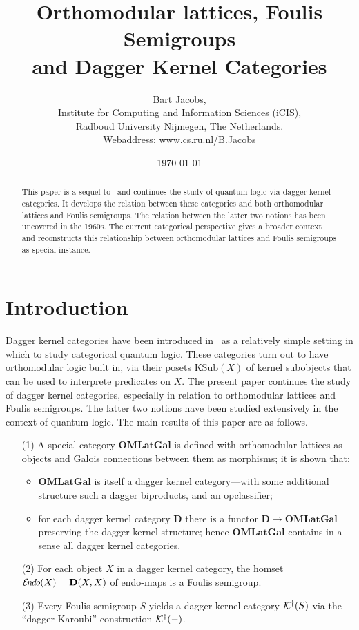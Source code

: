 \documentclass{article}
\title{Orthomodular lattices, Foulis Semigroups \\
       and Dagger Kernel Categories}
\author{Bart Jacobs, \\
{\small Institute for Computing and Information Sciences (iCIS),} \\[-.5em]
{\small Radboud University Nijmegen, The Netherlands.} \\[-.5em]
{\small Webaddress: \url{www.cs.ru.nl/B.Jacobs}}}
\date{\small \today}
\newcommand{\Cat}[1]{\ensuremath{\mathbf{#1}}}
\newcommand{\KSub}{\ensuremath{\mathrm{KSub}}}
\newcommand{\dagKaroubi}[1]{{\cal K}^{\dag}(#1)}
\newcommand{\EndoHom}[1]{{\cal E}{\kern-.5ex}\textit{n}{\kern-.2ex}\textit{d}{\kern-.2ex}\textit{o}(#1)}
\begin{document}
\maketitle

\begin{abstract}
This paper is a sequel to~\cite{HeunenJ09a} and continues the study of
quantum logic via dagger kernel categories. It develops the relation
between these categories and both orthomodular lattices and Foulis
semigroups. The relation between the latter two notions has been
uncovered in the 1960s. The current categorical perspective gives a
broader context and reconstructs this relationship between
orthomodular lattices and Foulis semigroups as special instance.
\end{abstract}


\section{Introduction}\label{IntroSec}

Dagger kernel categories have been introduced in~\cite{HeunenJ09a} as
a relatively simple setting in which to study categorical quantum
logic. These categories turn out to have orthomodular logic built in,
via their posets $\KSub(X)$ of kernel subobjects that can be used to
interprete predicates on $X$.  The present paper continues the study
of dagger kernel categories, especially in relation to orthomodular
lattices and Foulis semigroups. The latter two notions have been
studied extensively in the context of quantum logic. The main results
of this paper are as follows.
\begin{enumerate}
\item[(1)] A special category \Cat{OMLatGal} is defined with
  orthomodular lattices as objects and Galois connections between them
  as morphisms; it is shown that:
\begin{itemize}
\item \Cat{OMLatGal} is itself a dagger kernel category---with some
additional structure such a dagger biproducts, and an opclassifier;

\item for each dagger kernel category \Cat{D} there is a functor
  $\Cat{D} \rightarrow \Cat{OMLatGal}$ preserving the dagger kernel
  structure; hence \Cat{OMLatGal} contains in a sense all dagger
  kernel categories.
\end{itemize}

\item[(2)] For each object $X$ in a dagger kernel category, the homset
  $\EndoHom{X} = \Cat{D}(X,X)$ of endo-maps is a Foulis semigroup.

\item[(3)] Every Foulis semigroup $S$ yields a dagger kernel category
  $\dagKaroubi{S}$ via the ``dagger Karoubi'' construction
  $\dagKaroubi{-}$.
\end{enumerate}
\end{document}
